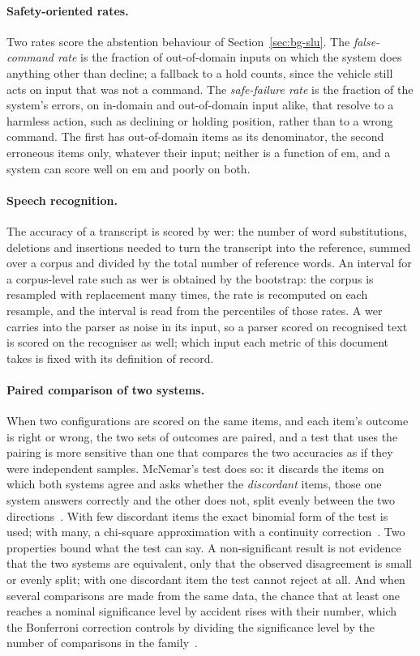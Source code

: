 \paragraph{Safety-oriented rates.} Two rates score the abstention behaviour of
Section~\ref{sec:bg-slu}. The \emph{false-command rate} is the fraction of out-of-domain inputs
on which the system does anything other than decline; a fallback to a hold counts, since the
vehicle still acts on input that was not a command. The \emph{safe-failure
rate} is the fraction of the system's errors, on in-domain and out-of-domain input alike, that
resolve to a harmless action, such as declining or holding position, rather than to a wrong
command. The first has out-of-domain items as its denominator, the second erroneous items only,
whatever their input; neither is a function of \gls{em}, and a system can score well on \gls{em}
and poorly on both.

\paragraph{Speech recognition.} The accuracy of a transcript is scored by \gls{wer}: the number of
word substitutions, deletions and insertions needed to turn the transcript into the reference,
summed over a corpus and divided by the total number of reference words. An interval for a
corpus-level rate such as \gls{wer} is obtained by the bootstrap: the corpus is resampled with
replacement many times, the rate is recomputed on each resample, and the interval is read from
the percentiles of those rates. A \gls{wer} carries into the parser as noise in its input, so a
parser scored on recognised text is scored on the recogniser as well; which input each metric of
this document takes is fixed with its definition of record.

\paragraph{Paired comparison of two systems.} When two configurations are scored on the same
items, and each item's outcome is right or wrong, the two sets of outcomes are paired, and a test
that uses the pairing is more sensitive than one that compares the two accuracies as if they were
independent samples. McNemar's test does so: it discards the items on which both systems agree
and asks whether the \emph{discordant} items, those one system answers correctly and the other does not,
split evenly between the two directions~\cite{mcnemar1947}. With few discordant items the exact
binomial form of the test is used; with many, a chi-square approximation with a continuity
correction~\cite{edwards1948}. Two properties bound what the test can say. A non-significant
result is not evidence that the two systems are equivalent, only that the observed disagreement
is small or evenly split; with one discordant item the test cannot reject at all. And when
several comparisons are made from the same data, the chance that at least one reaches a nominal
significance level by accident rises with their number, which the Bonferroni correction controls
by dividing the significance level by the number of comparisons in the family~\cite{dunn1961}.

